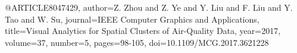 @ARTICLE{8047429,
  author={Z. {Zhou} and Z. {Ye} and Y. {Liu} and F. {Liu} and Y. {Tao} and W. {Su}},
  journal={IEEE Computer Graphics and Applications}, 
  title={Visual Analytics for Spatial Clusters of Air-Quality Data}, 
  year={2017},
  volume={37},
  number={5},
  pages={98-105},
  doi={10.1109/MCG.2017.3621228}}